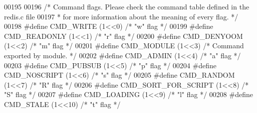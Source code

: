 \begin{DoxyCode}
{{{{{{00195 
00196 \textcolor{comment}{/* Command flags. Please check the command table defined in the redis.c file}
00197 \textcolor{comment}{ * for more information about the meaning of every flag. */}
00198 \textcolor{preprocessor}{#}\textcolor{preprocessor}{define} \textcolor{preprocessor}{CMD\_WRITE} \textcolor{preprocessor}{(}1\textcolor{preprocessor}{<<}0\textcolor{preprocessor}{)}            \textcolor{comment}{/* "w" flag */}
00199 \textcolor{preprocessor}{#}\textcolor{preprocessor}{define} \textcolor{preprocessor}{CMD\_READONLY} \textcolor{preprocessor}{(}1\textcolor{preprocessor}{<<}1\textcolor{preprocessor}{)}         \textcolor{comment}{/* "r" flag */}
00200 \textcolor{preprocessor}{#}\textcolor{preprocessor}{define} \textcolor{preprocessor}{CMD\_DENYOOM} \textcolor{preprocessor}{(}1\textcolor{preprocessor}{<<}2\textcolor{preprocessor}{)}          \textcolor{comment}{/* "m" flag */}
00201 \textcolor{preprocessor}{#}\textcolor{preprocessor}{define} \textcolor{preprocessor}{CMD\_MODULE} \textcolor{preprocessor}{(}1\textcolor{preprocessor}{<<}3\textcolor{preprocessor}{)}           \textcolor{comment}{/* Command exported by module. */}
00202 \textcolor{preprocessor}{#}\textcolor{preprocessor}{define} \textcolor{preprocessor}{CMD\_ADMIN} \textcolor{preprocessor}{(}1\textcolor{preprocessor}{<<}4\textcolor{preprocessor}{)}            \textcolor{comment}{/* "a" flag */}
00203 \textcolor{preprocessor}{#}\textcolor{preprocessor}{define} \textcolor{preprocessor}{CMD\_PUBSUB} \textcolor{preprocessor}{(}1\textcolor{preprocessor}{<<}5\textcolor{preprocessor}{)}           \textcolor{comment}{/* "p" flag */}
00204 \textcolor{preprocessor}{#}\textcolor{preprocessor}{define} \textcolor{preprocessor}{CMD\_NOSCRIPT} \textcolor{preprocessor}{(}1\textcolor{preprocessor}{<<}6\textcolor{preprocessor}{)}         \textcolor{comment}{/* "s" flag */}
00205 \textcolor{preprocessor}{#}\textcolor{preprocessor}{define} \textcolor{preprocessor}{CMD\_RANDOM} \textcolor{preprocessor}{(}1\textcolor{preprocessor}{<<}7\textcolor{preprocessor}{)}           \textcolor{comment}{/* "R" flag */}
00206 \textcolor{preprocessor}{#}\textcolor{preprocessor}{define} \textcolor{preprocessor}{CMD\_SORT\_FOR\_SCRIPT} \textcolor{preprocessor}{(}1\textcolor{preprocessor}{<<}8\textcolor{preprocessor}{)}  \textcolor{comment}{/* "S" flag */}
00207 \textcolor{preprocessor}{#}\textcolor{preprocessor}{define} \textcolor{preprocessor}{CMD\_LOADING} \textcolor{preprocessor}{(}1\textcolor{preprocessor}{<<}9\textcolor{preprocessor}{)}          \textcolor{comment}{/* "l" flag */}
00208 \textcolor{preprocessor}{#}\textcolor{preprocessor}{define} \textcolor{preprocessor}{CMD\_STALE} \textcolor{preprocessor}{(}1\textcolor{preprocessor}{<<}10\textcolor{preprocessor}{)}           \textcolor{comment}{/* "t" flag */}
}}}}}}
\end{DoxyCode}
